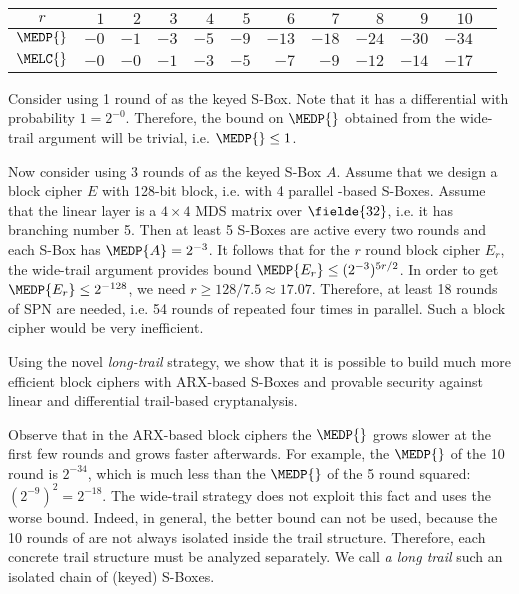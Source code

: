 \begin{table}[ht]
    \setlength{\tabcolsep}{4pt}
    \footnotesize
    \begin{center}
        \begin{tabular}{c|rrrrrrrrrrr}
            \toprule
            $r$    &  $1$ &  $2$ &  $3$ &  $4$ &  $5$ &  $6$ &  $7$ &  $8$ &  $9$ & $10$ & \\
            \midrule
            $\MEDP{}$ & $-0$ & $-1$ & $-3$ & $-5$ & $-9$ & $-13$ & $-18$ & $-24$ & $-30$ & $-34$ & \\
            $\MELC{}$ & $-0$ & $-0$ & $-1$ & $-3$ & $-5$ &  $-7$ &  $-9$ & $-12$ & $-14$ & $-17$ & \\ 
            \bottomrule
        \end{tabular}
    \end{center}
\end{table}

Consider using 1 round of  as the keyed S-Box. Note that it has a differential with probability $1=2^{-0}$. Therefore, the bound on $\MEDP{}$ obtained from the wide-trail argument will be trivial, i.e. $\MEDP{} \le 1$.

Now consider using 3 rounds of  as the keyed S-Box $A$. Assume that we design a block cipher $E$ with 128-bit block, i.e. with 4 parallel -based S-Boxes. Assume that the linear layer is a $4\times 4$ MDS matrix over $\fielde{32}$, i.e. it has branching number 5. Then at least 5 S-Boxes are active every two rounds and each S-Box has $\MEDP{A} = 2^{-3}$. It follows that for the $r$ round block cipher $E_r$, the wide-trail argument provides bound $\MEDP{E_r} \le (2^{-3})^{5r/2}$. In order to get $\MEDP{E_r} \le 2^{-128}$, we need $r \ge 128/7.5 \approx 17.07$. Therefore, at least 18 rounds of SPN are needed, i.e. 54 rounds of  repeated four times in parallel. Such a block cipher would be very inefficient.

Using the novel \emph{long-trail} strategy, we show that it is possible to build much more efficient block ciphers with ARX-based S-Boxes and provable security against linear and differential trail-based cryptanalysis.



Observe that in the ARX-based block ciphers the $\MEDP{}$ grows slower at the first few rounds and grows faster afterwards. For example, the $\MEDP{}$ of the 10 round  is $2^{-34}$, which is much less than the $\MEDP{}$ of the 5 round  squared: $(2^{-9})^2 = 2^{-18}$. The wide-trail strategy does not exploit this fact and uses the worse bound. Indeed, in general, the better bound can not be used, because the 10 rounds of  are not always isolated inside the trail structure. Therefore, each concrete trail structure must be analyzed separately. We call \emph{a long trail} such an isolated chain of (keyed) S-Boxes.

